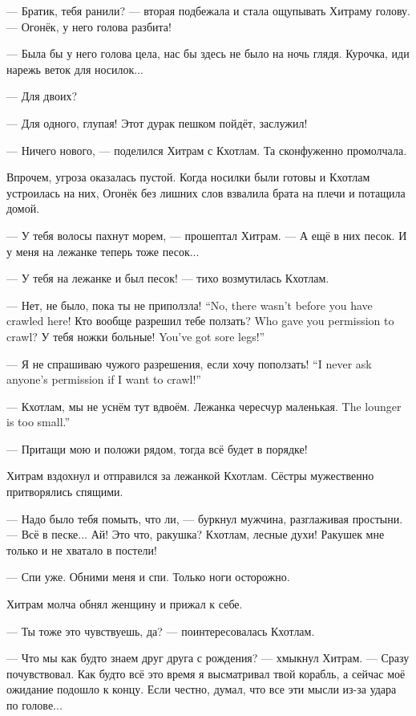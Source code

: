 --- Братик, тебя ранили? --- вторая подбежала и стала ощупывать Хитраму голову.
--- Огонёк, у него голова разбита!

--- Была бы у него голова цела, нас бы здесь не было на ночь глядя.
Курочка, иди нарежь веток для носилок...

--- Для двоих?

--- Для одного, глупая!
Этот дурак пешком пойдёт, заслужил!

--- Ничего нового, --- поделился Хитрам с Кхотлам.
Та сконфуженно промолчала.

Впрочем, угроза оказалась пустой.
Когда носилки были готовы и Кхотлам устроилась на них, Огонёк без лишних слов взвалила брата на плечи и потащила домой.

\asterism

--- У тебя волосы пахнут морем, --- прошептал Хитрам.
--- А ещё в них песок.
И у меня на лежанке теперь тоже песок...

--- У тебя на лежанке и был песок! --- тихо возмутилась Кхотлам.

{--- Нет, не было, пока ты не приползла!}
{``No, there wasn't before you have crawled here!}
{Кто вообще разрешил тебе ползать?}
{Who gave you permission to crawl?}
{У тебя ножки больные!}
{You've got sore legs!''}

{--- Я не спрашиваю чужого разрешения, если хочу поползать!}
{``I never ask anyone's permission if I want to crawl!''}

--- Кхотлам, мы не уснём тут вдвоём.
{Лежанка чересчур маленькая.}
{The lounger is too small.''}

--- Притащи мою и положи рядом, тогда всё будет в порядке!

Хитрам вздохнул и отправился за лежанкой Кхотлам.
Сёстры мужественно притворялись спящими.

--- Надо было тебя помыть, что ли, --- буркнул мужчина, разглаживая простыни.
--- Всё в песке...
Ай!
Это что, ракушка?
Кхотлам, лесные духи!
Ракушек мне только и не хватало в постели!

--- Спи уже.
Обними меня и спи.
Только ноги осторожно.

Хитрам молча обнял женщину и прижал к себе.

--- Ты тоже это чувствуешь, да? --- поинтересовалась Кхотлам.

--- Что мы как будто знаем друг друга с рождения? --- хмыкнул Хитрам.
--- Сразу почувствовал.
Как будто всё это время я высматривал твой корабль, а сейчас моё ожидание подошло к концу.
Если честно, думал, что все эти мысли из-за удара по голове...

